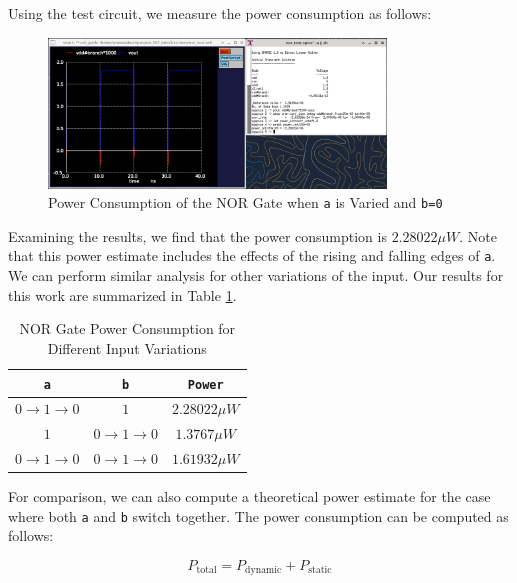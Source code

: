 \documentclass[fleqn]{article}
\begin{document}
	\noindent Using the test circuit, we measure the power consumption as follows:
	
	\begin{figure}[H]
		\centerline{\includegraphics[width=0.8\textwidth]{nor_power_sweep_va.png}}
		\caption{Power Consumption of the NOR Gate when \texttt{a} is Varied and \texttt{b=0}}
		\label{fig::nor_power_sweep_va}
	\end{figure}
	
	\noindent Examining the results, we find that the power consumption is $2.28022{\mu}W$. Note that this power estimate includes the effects of the rising and falling edges of \texttt{a}. We can perform similar analysis for other variations of the input. Our results for this work are summarized in Table \ref{table::nor_gate_power_analysis}.
	
	\begin{table}[H]
	\begin{center}
	\caption{NOR Gate Power Consumption for Different Input Variations}
	\label{table::nor_gate_power_analysis}
	\begin{tabular}{| c | c | c |}
		\hline
		\texttt{a} & \texttt{b} & \texttt{Power}\\
		\hline	
		$0 \rightarrow 1 \rightarrow 0$ & $1$ & $2.28022{\mu}W$ \\
		\hline	
		$1$ & $0 \rightarrow 1 \rightarrow 0$ & $1.3767{\mu}W$ \\
		\hline	
		$0 \rightarrow 1 \rightarrow 0$ & $0 \rightarrow 1 \rightarrow 0$ & $1.61932{\mu}W$\\
		\hline
	\end{tabular}
	\end{center}
	\end{table}
	
	For comparison, we can also compute a theoretical power estimate for the case where both \texttt{a} and \texttt{b} switch together. The power consumption can be computed as follows:
	
	\begin{equation}
		P_{\text{total}} = P_{\text{dynamic}} + P_{\text{static}}
	\end{equation}
	
\end{document}

